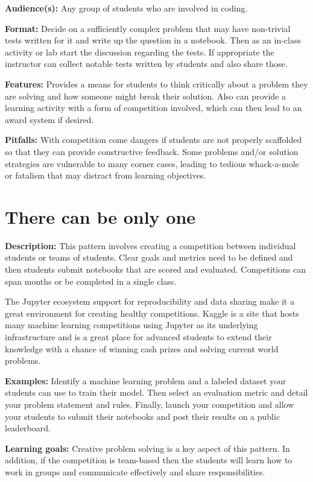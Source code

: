 \documentclass[]{book}
\begin{document}
\textbf{Audience(s):} Any group of students who are involved in coding.

\textbf{Format:} Decide on a sufficiently complex problem that may have
non-trivial tests written for it and write up the question in a
notebook. Then as an in-class activity or lab start the discussion
regarding the tests. If appropriate the instructor can collect notable
tests written by students and also share those.

\textbf{Features:} Provides a means for students to think critically
about a problem they are solving and how someone might break their
solution. Also can provide a learning activity with a form of
competition involved, which can then lead to an award system if desired.

\textbf{Pitfalls:} With competition come dangers if students are not
properly scaffolded so that they can provide constructive feedback. Some
problems and/or solution strategies are vulnerable to many corner cases,
leading to tedious whack-a-mole or fatalism that may distract from
learning objectives.

\section{There can be only one}\label{there-can-be-only-one}

\textbf{Description:} This pattern involves creating a competition
between individual students or teams of students. Clear goals and
metrics need to be defined and then students submit notebooks that are
scored and evaluated. Competitions can span months or be completed in a
single class.

The Jupyter ecosystem support for reproducibility and data sharing make
it a great environment for creating healthy competitions. Kaggle is a
site that hosts many machine learning competitions using Jupyter as its
underlying infrastructure and is a great place for advanced students to
extend their knowledge with a chance of winning cash prizes and solving
current world problems.

\textbf{Examples:} Identify a machine learning problem and a labeled
dataset your students can use to train their model. Then select an
evaluation metric and detail your problem statement and rules. Finally,
launch your competition and allow your students to submit their
notebooks and post their results on a public leaderboard.

\textbf{Learning goals:} Creative problem solving is a key aspect of
this pattern. In addition, if the competition is team-based then the
students will learn how to work in groups and communicate effectively
and share responsibilities.
\end{document}
